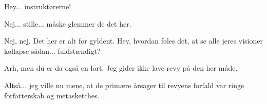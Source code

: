 \documentclass[a4paper,11pt]{article}
\begin{document}
\begin{sketch}
 Hey... instruktørerne!

 Nej... stille... måske glemmer de det her.

 Nej, nej. Det her er alt for gyldent. Hey, hvordan føles det, at se alle jeres visioner kollapse sådan... fuldstændigt?

 Arh, men du er da også en lort. Jeg gider ikke lave revy på den her måde.


 Altså... jeg ville nu mene, at de primære årsager til revyens forfald var ringe forfatterskab og metasketches.

\end{sketch}
\end{document}
